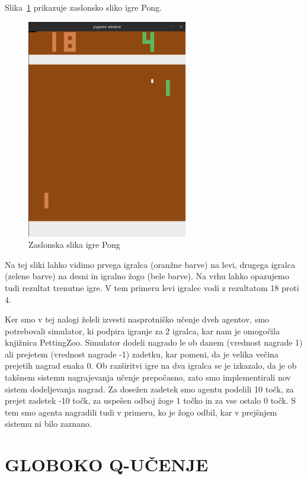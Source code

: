 \documentclass[cover]{thesis}
\begin{document}
Slika~\ref{fig:pong} prikazuje zaslonsko sliko igre Pong.

\begin{figure}[H]
    \centering
    \includegraphics[width=7cm]{pong.png}
    \caption{Zaslonska slika igre Pong}\label{fig:pong}
\end{figure}

Na tej sliki lahko vidimo prvega igralca (oranžne barve) na levi, drugega igralca (zelene barve) na desni in igralno žogo (bele barve). Na vrhu lahko opazujemo tudi rezultat trenutne igre. V tem primeru levi igralec vodi z rezultatom 18 proti 4.

Ker smo v tej nalogi želeli izvesti nasprotniško učenje dveh agentov, smo potrebovali simulator, ki podpira igranje za 2 igralca, kar nam je omogočila knjižnica PettingZoo. Simulator dodeli nagrado le ob danem (vrednost nagrade 1) ali prejetem (vrednost nagrade -1) zadetku, kar pomeni, da je velika večina prejetih nagrad enaka 0. Ob razširitvi igre na dva igralca se je izkazalo, da je ob takšnem sistemu nagrajevanja učenje prepočasno, zato smo implementirali nov sistem dodeljevanja nagrad. Za dosežen zadetek smo agentu podelili 10 točk, za prejet zadetek -10 točk, za uspešen odboj žoge 1 točko in za vse ostalo 0 točk. S tem smo agenta nagradili tudi v primeru, ko je žogo odbil, kar v prejšnjem sistemu ni bilo zaznano.

\section{GLOBOKO Q-UČENJE}
\end{document}
